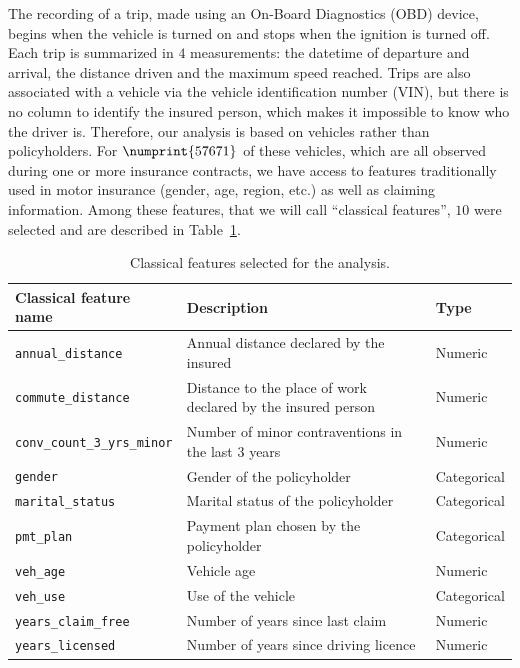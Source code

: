 \documentclass{article}
\begin{document}
The recording of a trip, made using an On-Board Diagnostics (OBD) device, begins when the vehicle is turned on and stops when the ignition is turned off. Each trip is summarized in $4$ measurements: the datetime of departure and arrival, the distance driven and the maximum speed reached. Trips are also associated with a vehicle via the vehicle identification number (VIN), but there is no column to identify the insured person, which makes it impossible to know who the driver is. Therefore, our analysis is based on vehicles rather than policyholders. For $\numprint{57671}$ of these vehicles, which are all observed during one or more insurance contracts, we have access to features traditionally used in motor insurance (gender, age, region, etc.) as well as claiming information. Among these features, that we will call ``classical features'', $10$ were selected and are described in Table~\ref{tab:2}. 
\begin{table}[ht]
    \centering
    \begin{adjustbox}{max width = \textwidth}
        \begin{tabular}{l l l}
            \toprule 
            \textbf{Classical feature name} & \textbf{Description} & \textbf{Type} \\
            \midrule
            \texttt{annual\_distance} & Annual distance declared by the insured & Numeric\\
            \texttt{commute\_distance} & Distance to the place of work declared by the insured person & Numeric\\
            \texttt{conv\_count\_3\_yrs\_minor} & Number of minor contraventions in the last 3 years & Numeric\\
            \texttt{gender} & Gender of the policyholder & Categorical\\
            \texttt{marital\_status} & Marital status of the policyholder & Categorical\\
            \texttt{pmt\_plan} & Payment plan chosen by the policyholder & Categorical\\
            \texttt{veh\_age} & Vehicle age & Numeric\\
            \texttt{veh\_use} & Use of the vehicle & Categorical\\
            \texttt{years\_claim\_free} & Number of years since last claim & Numeric\\
            \texttt{years\_licensed} & Number of years since driving licence & Numeric\\
            \bottomrule 
        \end{tabular}
    \end{adjustbox}
    \caption{Classical features selected for the analysis.} 
    \label{tab:2} 
\end{table}
\end{document}
